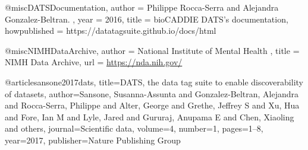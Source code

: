 @misc{DATSDocumentation,
 author = { Philippe Rocca-Serra and Alejandra Gonzalez-Beltran. },
 year = {2016},
 title = {{bioCADDIE DATS}'s documentation},
 howpublished = {https://datatagsuite.github.io/docs/html}
}

@misc{NIMHDataArchive,
 author = {National Institute of Mental Health },
 title = {NIMH Data Archive},
 url = {\url{https://nda.nih.gov/}}
}



@article{sansone2017dats,
  title={{DATS}, the data tag suite to enable discoverability of datasets},
  author={Sansone, Susanna-Assunta and Gonzalez-Beltran, Alejandra and Rocca-Serra, Philippe and Alter, George and Grethe, Jeffrey S and Xu, Hua and Fore, Ian M and Lyle, Jared and Gururaj, Anupama E and Chen, Xiaoling and others},
  journal={Scientific data},
  volume={4},
  number={1},
  pages={1--8},
  year={2017},
  publisher={Nature Publishing Group}
}






